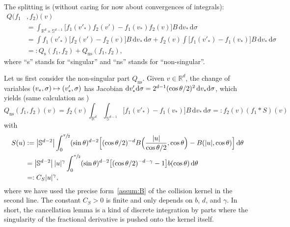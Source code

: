 \documentclass[JEP,XML,SOM,Unicode,NoFloatCountersInSection]{cedram}
\newcommand\mto{\mathchoice{\longmapsto}{\mapsto}{\mapsto}{\mapsto}}
\newcommand{\ns}{\mathrm{ns}}
\newcommand{\rs}{\mathrm{s}}
\theoremstyle{plain}
\theoremstyle{definition}
\numberwithin{equation}{section}
\newcommand{\R}{\mathbb R}
\newcommand{\Sp}{\mathbb S^{d-1}}
\newcommand{\dd} {\, \mathrm{d}}
\begin{document}
The splitting is (without caring for now about convergences of integrals):
\begin{equation}\label{e:split}
\begin{split}
Q (f_1&,f_2)(v) \\
& = \int_{\R^d \times \Sp} \Big[ f_1(v'_*) f_2(v')
- f_1(v_*) f_2(v) \Big] B \dd v_* \dd \sigma \\
& = \int f_1(v'_*) \big[ f_2(v')-f_2(v) \big] B \dd v_*
\dd \sigma + f_2(v) \int \big[ f_1(v'_*) - f_1(v_*)
\big] B \dd v_* \dd \sigma \\
& =: Q_{\rs}(f_1,f_2) + Q_{\ns}(f_1,f_2),
\end{split}
\end{equation}
where ``s'' stands for ``singular'' and ``ns'' stands for
``non-singular''.

Let us first consider the non-singular part $Q_{\ns}$. Given
$v \in \R^d$, the change of variables
$(v_*,\sigma) \mto (v'_*,\sigma)$ has Jacobian
${\rm d} v'_* {\rm d}\sigma = 2^{d-1} (\cos \theta/2)^2 \, {\rm d} v_*
{\rm d}\sigma$, which yields (same calculation as
\cite[Lem.\,1]{advw})
\begin{equation*}
Q_{\ns}(f_1,f_2)(v) = f_2(v) \int_{\R^d} \int_{\Sp} \big[ f_1(v'_*) - f_1(v_*)
\big] B \dd v_* \dd \sigma
=: f_2(v) (f_1 * S)(v)
\end{equation*}
with
\begin{align*}
S(u) & := \left|\mathbb S^{d-2}\right| \int_0^{\sfrac{\pi}{2}} (\sin
\theta)^{d-2} \Big[ (\cos \theta/2)^{-d}
B\Bigl( \frac{|u|}{\cos\theta/2}, \cos \theta \Bigr) - B(|u|,\cos \theta) \Big]
\dd \theta\\
& = \left|\mathbb S^{d-2}\right| |u|^\gamma
\int_0^{\sfrac{\pi}{2}} (\sin
\theta)^{d-2} \big[ (\cos \theta/2)^{-d-\gamma}
- 1 \big] b(\cos \theta)
\dd \theta \\
& =: C_S |u|^\gamma,
\end{align*}
where we have used the precise form~\eqref{assum:B} of the collision
kernel in the second line. The constant $C_S >0$ is finite and only
depends on $b$, $d$, and $\gamma$. In short, the cancellation lemma is
a kind of discrete integration by parts where the singularity of the
fractional derivative is pushed onto the kernel itself.
\end{document}
